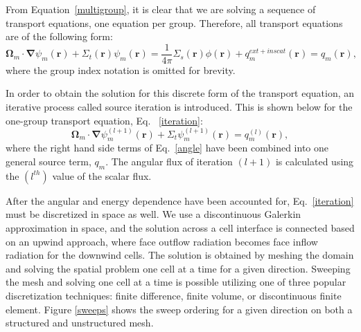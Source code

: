 \documentclass{anstrans}
\renewcommand{\vec}[1]{\bm{#1}} %
\newcommand{\vr}{\vec{r}}
\newcommand{\vo}{\vec{\Omega}}
\begin{document}
From Equation~\eqref{multigroup}, it is clear that we are solving a sequence of transport equations, one equation per group. Therefore, all transport equations are of the following form:
\begin{equation}
\vo_m \cdot \vec \nabla \psi_{m}(\vr) +\Sigma_{t}(\vr) \psi_{m}(\vr)  = \frac{1}{4\pi}\Sigma_{s}(\vr)\phi(\vr) + q^{ext+inscat}_m(\vr) = q_m(\vr),
\end{equation}
where the group index notation is omitted for brevity.

In order to obtain the solution for this discrete form of the transport equation, an iterative process called source iteration is introduced. This is shown below for the one-group transport equation, Eq. ~\eqref{iteration}:
\begin{equation}
\vo_m \cdot \vec\nabla \psi_m^{(l+1)}(\vr) + \Sigma_t \psi_m^{(l+1)}(\vr) = q_m^{(l)}(\vr),
\label{iteration}
\end{equation}
where the right hand side terms of Eq.~\eqref{angle} have been combined into one general source term, $q_m$. The angular flux of iteration $(l+1)$ is calculated using the $(l^{th})$ value of the scalar flux.

After the angular and energy dependence have been accounted for, Eq.~\eqref{iteration} must be discretized in space as well. We use a discontinuous Galerkin approximation in space,  and the solution across a cell interface is connected based on an upwind approach, where face outflow radiation becomes face inflow radiation for the downwind cells. The solution is obtained by meshing the domain and solving the spatial problem one cell at a time for a given direction. Sweeping the mesh and solving one cell at a time is possible utilizing one of three popular discretization techniques: finite difference\cite{fd}, finite volume\cite{fd}, or discontinuous finite element\cite{Reed}. Figure \ref{sweeps} shows the sweep ordering for a given direction on both a structured and unstructured mesh.
\end{document}
